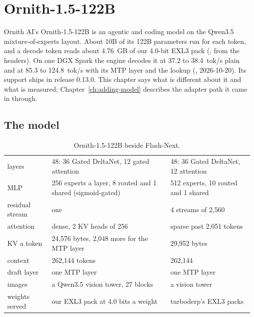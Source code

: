 \chapter{Ornith-1.5-122B}\label{ch:ornith}

Ornith AI's Ornith-1.5-122B is an agentic and coding model on the Qwen3.5 mixture-of-experts layout. About 10B of its 122B parameters run for each token, and a decode token reads about 4.76~GB of our 4.0-bit EXL3 pack (\arith, from the headers). On one DGX Spark the engine decodes it at 37.2 to 38.4~tok/s plain and at 85.3 to 124.8~tok/s with its MTP layer and the lookup (\measured, 2026-10-20). Its support ships in release 0.13.0. This chapter says what is different about it and what is measured; Chapter~\ref{ch:adding-model} describes the adapter path it came in through.

\section{The model}

\begin{table}[htbp]
\centering\small
\caption{Ornith-1.5-122B beside Flash-Next.}\label{tab:orn-model}
\begin{tabularx}{\linewidth}{@{}L{.2\linewidth}YL{.3\linewidth}@{}}
\toprule
{} &  &  \\
\midrule
layers & 48: 36 Gated DeltaNet, 12 gated attention & 48: 36 Gated DeltaNet, 12 attention \\
MLP & 256 experts a layer, 8 routed and 1 shared (sigmoid-gated) & 512 experts, 10 routed and 1 shared \\
residual stream & one & 4 streams of 2,560 \\
attention & dense, 2 KV heads of 256 & sparse past 2,051 tokens \\
KV a token & 24,576 bytes, 2,048 more for the MTP layer & 29,952 bytes \\
context & 262,144 tokens & 262,144 \\
draft layer & one MTP layer & one MTP layer \\
images & a Qwen3.5 vision tower, 27 blocks & a vision tower \\
weights served & our EXL3 pack at 4.0 bits a weight & turboderp's EXL3 packs \\
\bottomrule
\end{tabularx}
\end{table}


